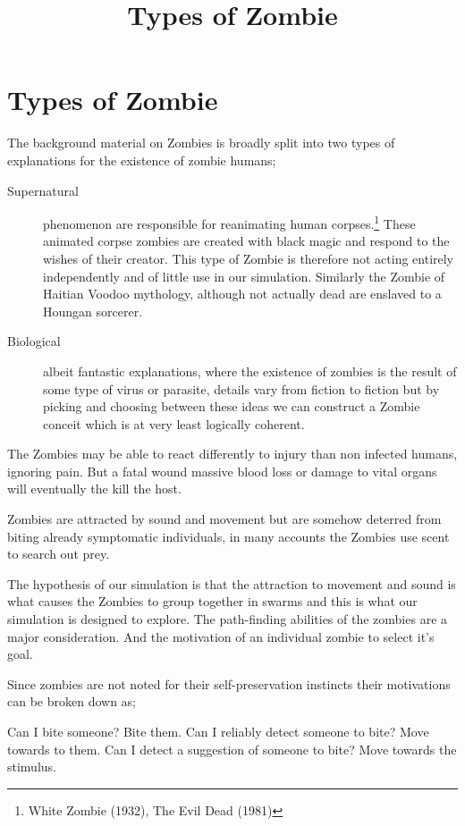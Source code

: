 \pagestyle{empty}
\setcounter{section}{1}
\title{Types of Zombie}

\section{Types of Zombie}The background material on Zombies is broadly split into two types of explanations for the existence of zombie humans;
\begin{description}
\item[Supernatural] phenomenon are responsible for reanimating human corpses.\footnote{White Zombie (1932), The Evil Dead (1981)} These animated corpse zombies are created with black magic and respond to the wishes of their creator. This type of Zombie is therefore not acting entirely independently and of little use in our simulation. Similarly the Zombie of Haitian Voodoo mythology, although not actually dead are enslaved to a Houngan sorcerer.
\item[Biological] albeit fantastic explanations, where the existence of zombies is the result of some type of virus or parasite, details vary from fiction to fiction but by picking and choosing between these ideas we can construct a Zombie conceit which is at very least logically coherent.
\end{description}
The Zombies may be able to react differently to injury than non infected humans, ignoring pain. But a fatal wound massive blood loss or damage to vital organs will eventually the kill the host.

Zombies are attracted by sound and movement but are somehow deterred from biting already symptomatic individuals, in many accounts the Zombies use scent to search out prey.

The hypothesis of our simulation is that the attraction to movement and sound is what causes the Zombies to group together in swarms and this is what our simulation is designed to explore. The path-finding abilities of the zombies are a major consideration.
And the motivation of an individual zombie to select it's goal.

Since zombies are not noted for their self-preservation instincts their motivations can be broken down as;

Can I bite someone? Bite them.
Can I reliably detect someone to bite? Move towards to them.
Can I detect a suggestion of someone to bite? Move towards the stimulus.
\endinput
